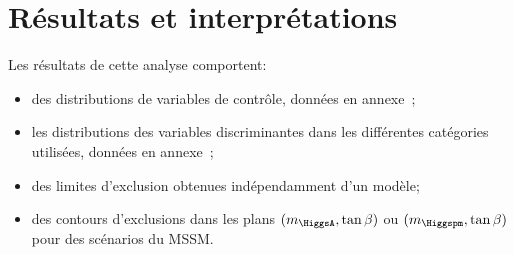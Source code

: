 \section{Résultats et interprétations}\label{chapter-HTT_analysis-section-results}
Les résultats de cette analyse comportent:
\begin{itemize}
\item des distributions de variables de contrôle, données en annexe~;
\item les distributions des variables discriminantes dans les différentes catégories utilisées, données en annexe~;
\item des limites d'exclusion obtenues indépendamment d'un modèle;
\item des contours d'exclusions dans les plans $(m_{\HiggsA},\tan\beta)$ ou $(m_{\Higgspm},\tan\beta)$ pour des scénarios du MSSM.
\end{itemize}
